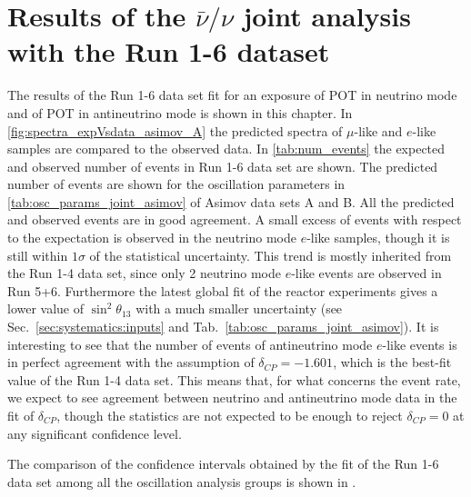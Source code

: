 
\clearpage

\section {Results of the $\bar{\nu}/\nu$ joint analysis with the Run 1-6 dataset}
\label{sec:results}

The results of the Run 1-6 data set fit
for an exposure 
of \TotalPotNu POT in neutrino mode
and
of \TotalPotNuBar POT in antineutrino mode 
is shown in this chapter.
In \cref{fig:spectra_expVsdata_asimov_A} the predicted spectra of $\mu$-like and $e$-like samples
are compared to the observed data.
In \cref{tab:num_events} the expected and observed number of events in Run 1-6 data set are shown.
The predicted number of events are shown for the oscillation parameters in \cref{tab:osc_params_joint_asimov}
of Asimov data sets A and B.
All the predicted and observed events are in good agreement.
A small excess of events with respect to the expectation is observed in 
the neutrino mode $e$-like samples, though it is still within $1\sigma$ of the statistical uncertainty.
This trend is mostly inherited from the Run 1-4 data set, since only 2 neutrino mode $e$-like events
are observed in Run 5+6.
Furthermore the latest global fit of the reactor experiments 
gives a lower value of $\sin^2 \theta_{13}$ 
with a much smaller uncertainty (see Sec.~\ref{sec:systematics:inputs} and Tab.~\ref{tab:osc_params_joint_asimov}).
It is interesting to see that the number of events of antineutrino mode $e$-like events 
is in perfect agreement with the assumption of $\delta_{CP} = -1.601$,
which is the best-fit value of the Run 1-4 data set. 
This means that, for what concerns the event rate, we expect to see
agreement between neutrino and antineutrino mode data in the fit of $\delta_{CP}$,
though the statistics are not expected to be enough to reject 
$\delta_{CP}=0$ at any significant confidence level.  

The comparison of the confidence intervals obtained by the fit of the Run 1-6 data set
among all the oscillation analysis groups is shown in \cite{Mach3JointFitRun16}.


\clearpage


